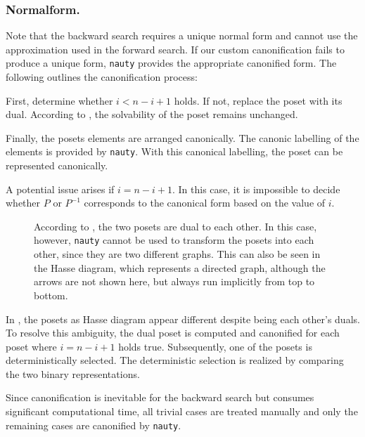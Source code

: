 \documentclass[twoside,leqno,twocolumn]{article}
\begin{document}
\subsubsection{Normalform.} \label{sec:backward:normal_form}
Note that the backward search requires a unique normal form and cannot use the approximation used in the forward search.
If our custom canonification fails to produce a unique form, \texttt{nauty} provides the appropriate canonified form.
The following outlines the canonification process:

First, determine whether $i < n - i + 1$ holds.
If not, replace the poset with its dual.
According to , the solvability of the poset remains unchanged.

Finally, the posets elements are arranged canonically.
The canonic labelling of the elements is provided by \texttt{nauty}.
With this canonical labelling, the poset can be represented canonically.

A potential issue arises if $i = n - i + 1$.
In this case, it is impossible to decide whether $P$ or $P^{-1}$ corresponds to the canonical form based on the value of $i$.

\begin{figure}[!b]
  \centering
  
  \caption{According to , the two posets are dual to each other.
    In this case, however, \texttt{nauty} cannot be used to transform the posets into each other, since they are two different graphs. This can also be seen in the Hasse diagram, which represents a directed graph, although the arrows are not shown here, but always run implicitly from top to bottom.}
  \label{fig:backward_canonify_problematic}
\end{figure}


In , the posets as Hasse diagram appear different despite being each other's duals.
To resolve this ambiguity, the dual poset is computed and canonified for each poset where $i = n - i + 1$ holds true.
Subsequently, one of the posets is deterministically selected.
The deterministic selection is realized by comparing the two binary representations.

Since canonification is inevitable for the backward search but consumes significant computational time, all trivial cases are treated manually and only the remaining cases are canonified by \texttt{nauty}.
\end{document}
